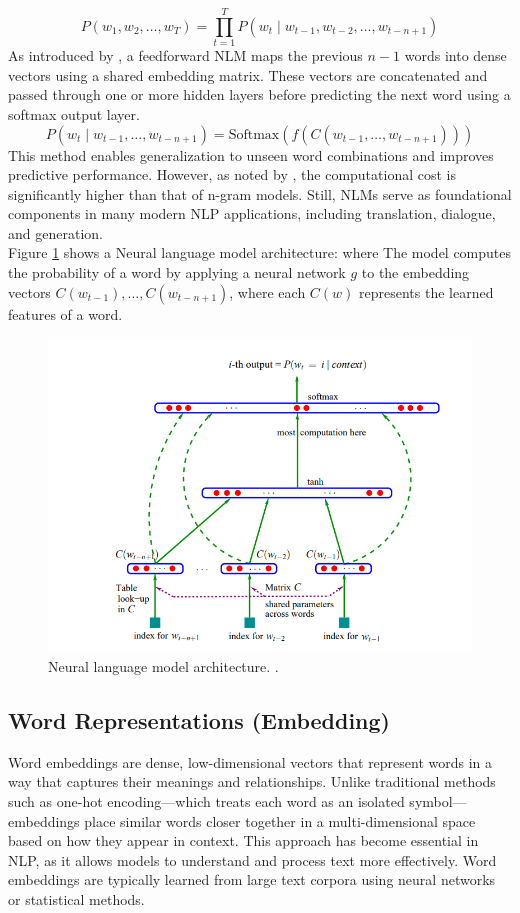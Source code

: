 \begin{equation}
P(w_1, w_2, \dots, w_T) = \prod_{t=1}^{T} P(w_t \mid w_{t-1}, w_{t-2}, \dots, w_{t-n+1})	
\end{equation}
As introduced by \citep{BengioDVJ03}, a feedforward NLM maps the previous \(n-1\) words into dense vectors using a shared embedding matrix. These vectors are concatenated and passed through one or more hidden layers before predicting the next word using a softmax output layer.
\begin{equation}
P(w_t \mid w_{t-1}, \dots, w_{t-n+1}) = \text{Softmax}(f(C(w_{t-1}, \dots, w_{t-n+1})))
\end{equation}
This method enables generalization to unseen word combinations and improves predictive performance. However, as noted by \cite{jurafsky2019speech}, the computational cost is significantly higher than that of n-gram models. Still, NLMs serve as foundational components in many modern NLP applications, including translation, dialogue, and generation.\\
Figure \ref{neurel_languge} shows a Neural language model architecture: where The model computes the probability of a word by applying a neural network \( g \) to the embedding vectors \( C(w_{t-1}), \dots, C(w_{t-n+1}) \), where each \( C(w) \) represents the learned features of a word.
 \begin{figure}[H]
	\centering
	\includegraphics[width=0.7\linewidth]{Figures/nlm.png}

	\caption{
		Neural language model architecture.
			\label{neurel_languge}.
	}
	
	
	
\end{figure}
\subsection{Word Representations (Embedding)}
Word embeddings are dense, low-dimensional vectors that represent words in a way that captures their meanings and relationships. Unlike traditional methods such as one-hot encoding—which treats each word as an isolated symbol—embeddings place similar words closer together in a multi-dimensional space based on how they appear in context\citep{barnard2024word}.
This approach has become essential in NLP, as it allows models to understand and process text more effectively. Word embeddings are typically learned from large text corpora using neural networks or statistical methods.


